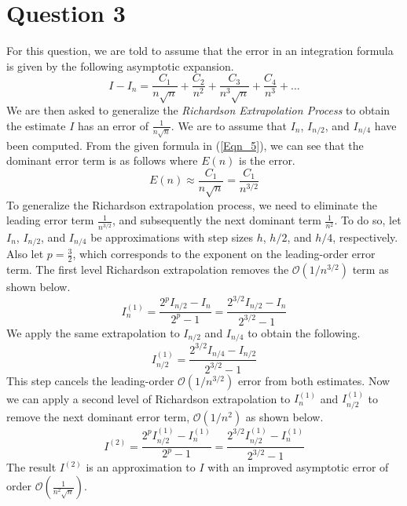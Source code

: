 \documentclass{article}
\begin{document}
\section{Question 3}
For this question, we are told to assume that the error in an integration formula is given by the following asymptotic expansion.
\begin{equation}
    \label{Eqn_5}
    I-I_n = \frac{C_1}{n\sqrt{n}} + \frac{C_2}{n^2} + \frac{C_3}{n^3\sqrt{n}} + \frac{C_4}{n^3} + \dots
\end{equation}
We are then asked to generalize the \textit{Richardson Extrapolation Process} to obtain the estimate \(I\) has an error of \(\frac{1}{n\sqrt{n}}\). We are to assume that \(I_n\), \(I_{n/2}\), and \(I_{n/4}\) have been computed.
From the given formula in (\ref{Eqn_5}), we can see that the dominant error term is as follows where \(E(n)\) is the error.
\[
E(n) \approx \frac{C_1}{n\sqrt{n}} = \frac{C_1}{n^{3/2}}
\]
To generalize the Richardson extrapolation process, we need to eliminate the leading error term \(\frac{1}{n^{3/2}}\), and subsequently the next dominant term \(\frac{1}{n^2}\). To do so, let \(I_n\), \(I_{n/2}\), and \(I_{n/4}\) be approximations with step sizes \(h\), \(h/2\), and \(h/4\), respectively. Also let \(p = \frac{3}{2}\), which corresponds to the exponent on the leading-order error term. The first level Richardson extrapolation removes the \(\mathcal{O}(1/n^{3/2})\) term as shown below.
\[
I^{(1)}_n = \frac{2^p I_{n/2} - I_n}{2^p - 1} = \frac{2^{3/2} I_{n/2} - I_n}{2^{3/2} - 1}
\]
We apply the same extrapolation to \(I_{n/2}\) and \(I_{n/4}\) to obtain the following.
\[
I^{(1)}_{n/2} = \frac{2^{3/2} I_{n/4} - I_{n/2}}{2^{3/2} - 1}
\]
This step cancels the leading-order \(\mathcal{O}(1/n^{3/2})\) error from both estimates. Now we can apply a second level of Richardson extrapolation to \(I^{(1)}_n\) and \(I^{(1)}_{n/2}\) to remove the next dominant error term, \(\mathcal{O}(1/n^2)\) as shown below.
\[
I^{(2)} = \frac{2^p I^{(1)}_{n/2} - I^{(1)}_n}{2^p - 1} = \frac{2^{3/2} I^{(1)}_{n/2} - I^{(1)}_n}{2^{3/2} - 1}
\]
The result \(I^{(2)}\) is an approximation to \(I\) with an improved asymptotic error of order \(\mathcal{O}\left(\frac{1}{n^2\sqrt{n}}\right)\).
\end{document}
